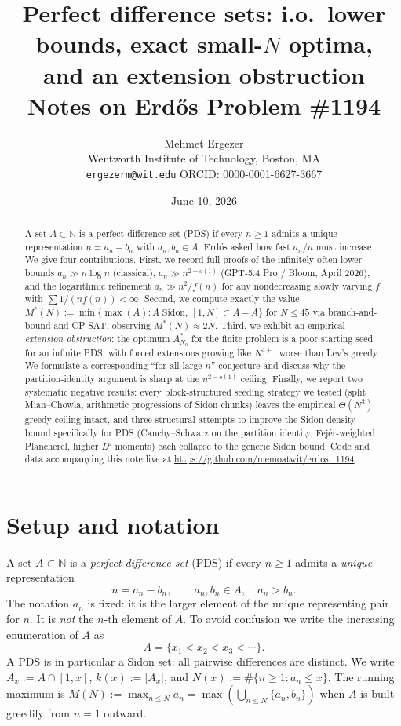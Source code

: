 \documentclass[11pt]{article}
\title{Perfect difference sets: i.o.\ lower bounds, exact small-$N$ optima,\\
  and an extension obstruction \\
  \large Notes on Erd\H{o}s Problem \#1194}
\author{Mehmet Ergezer\\
  \small Wentworth Institute of Technology, Boston, MA\\
  \small \texttt{ergezerm@wit.edu} \quad ORCID: 0000-0001-6627-3667}
\date{June 10, 2026}
\begin{document}
\maketitle

\begin{abstract}
A set $A \subset \mathbb{N}$ is a perfect difference set (PDS) if every
$n \geq 1$ admits a unique representation $n = a_n - b_n$ with
$a_n, b_n \in A$. Erd\H{o}s asked how fast $a_n/n$ must increase
\cite{Er80}. We give four contributions. First, we record full proofs of
the infinitely-often lower bounds $a_n \gg n \log n$ (classical),
$a_n \gg n^{2-o(1)}$ (GPT-5.4 Pro / Bloom, April 2026), and the
logarithmic refinement $a_n \gg n^2/f(n)$ for any nondecreasing slowly
varying $f$ with $\sum 1/(nf(n)) < \infty$. Second, we compute exactly
the value $M^*(N) := \min\{\max(A) : A \text{ Sidon},\ [1,N]\subset A-A\}$
for $N \leq 45$ via branch-and-bound and CP-SAT, observing $M^*(N) \approx 2N$.
Third, we exhibit an empirical \emph{extension obstruction}:
the optimum $A_{N_0}^*$ for the finite problem is a poor starting
seed for an infinite PDS, with forced extensions growing like $N^{4+}$,
worse than Lev's greedy. We formulate a corresponding ``for all large
$n$'' conjecture and discuss why the partition-identity argument is
sharp at the $n^{2-o(1)}$ ceiling. Finally, we report two systematic
negative results: every block-structured seeding strategy we tested
(split Mian--Chowla, arithmetic progressions of Sidon chunks) leaves the
empirical $\Theta(N^3)$ greedy ceiling intact, and three structural
attempts to improve the Sidon density bound specifically for PDS
(Cauchy--Schwarz on the partition identity, Fej\'er-weighted Plancherel,
higher $L^p$ moments) each collapse to the generic Sidon bound. Code and
data accompanying this note live at
\url{https://github.com/memoatwit/erdos_1194}.
\end{abstract}

\tableofcontents

\section{Setup and notation}\label{sec:setup}

A set $A \subset \mathbb{N}$ is a \emph{perfect difference set} (PDS) if
every $n \geq 1$ admits a \emph{unique} representation
\[
   n = a_n - b_n, \qquad a_n, b_n \in A, \quad a_n > b_n.
\]
The notation $a_n$ is fixed: it is the larger element of the unique
representing pair for $n$. It is \emph{not} the $n$-th element of $A$.
To avoid confusion we write the increasing enumeration of $A$ as
\[
   A = \{x_1 < x_2 < x_3 < \cdots\}.
\]
A PDS is in particular a Sidon set: all pairwise differences are
distinct. We write $A_x := A \cap [1, x]$, $k(x) := |A_x|$, and
$N(x) := \#\{n \geq 1 : a_n \leq x\}$. The running maximum is
$M(N) := \max_{n \leq N} a_n = \max(\bigcup_{n \leq N}\{a_n, b_n\})$
when $A$ is built greedily from $n = 1$ outward.
\end{document}
